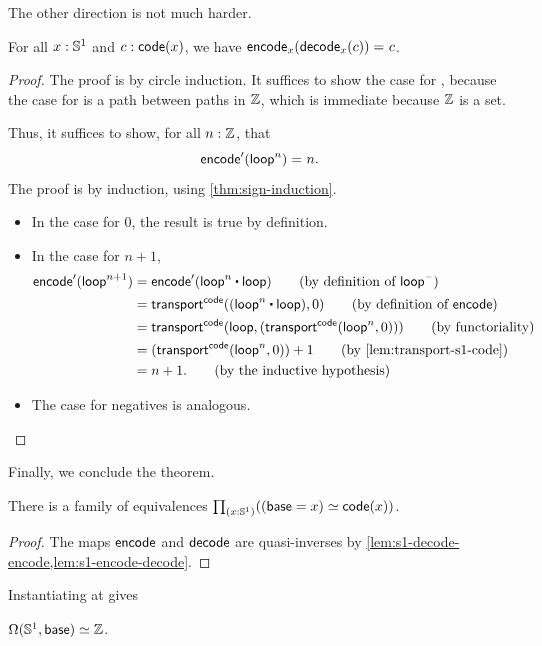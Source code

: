 The other direction is not much harder.

\begin{lem} \label{lem:s1-encode-decode} For all
$x: \mathbb{S} ^1$ and $c : \mathsf{code}(x)$, we have $\mathsf{encode}_x({{\mathsf{decode}_x(c)}}) =_{} c$.
\end{lem}

\begin{proof}
The proof is by circle induction.  It suffices to show the case for
\base, because the case for \lloop is a path between paths in
$\mathbb{Z}$, which is immediate because $\mathbb{Z}$ is a set.

Thus, it suffices to show, for all $n : \mathbb{Z}$, that
\[
\mathsf{encode}'(\mathsf{loop}^n) =_{} n.
\]
The proof is by induction, using \cref{thm:sign-induction}.
%
\begin{itemize}

\item In the case for $0$, the result is true by definition.

\item In the case for $n+1$,
\begin{align}
 {\encode'(\lloop^{n+1})}
&= {\encode'(\lloop^{n} \ct \lloop)} \tag{by definition of $\lloop^{\blank}$} \\
&= \transfib{\code}{(\lloop^{n} \ct \lloop)}{0} \tag{by definition of $\encode$}\\
&= \transfib{\code}{\lloop}{(\transfib{\code}{\lloop^n}{0})} \tag{by functoriality}\\
&= {(\transfib{\code}{\lloop^n}{0})} + 1 \tag{by \cref{lem:transport-s1-code}}\\
&= n + 1. \tag{by the inductive hypothesis}
\end{align}

\item The case for negatives is analogous.  \qedhere
\end{itemize}
\end{proof}

Finally, we conclude the theorem.

\begin{thm}
There is a family of equivalences $\prd{x : \Sn ^1} (\eqv {(\base=x)} {\code(x)})$.
\end{thm}
\begin{proof}
The maps $\mathsf{encode}$ and $\mathsf{decode}$ are quasi-inverses by
\cref{lem:s1-decode-encode,lem:s1-encode-decode}.
\end{proof}

Instantiating at {\base} gives
\begin{cor}\label{cor:omega-s1}
$\Omega(\mathbb{S}^1,\mathsf{base}) \simeq \mathbb{Z}$.
\end{cor}

